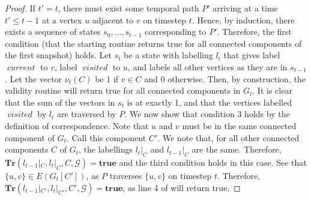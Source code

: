 \documentclass[a4paper,UKenglish,cleveref, autoref, thm-restate]{lipics-v2021} %
\DeclareMathOperator{\visited}{\textit{visited}}
\DeclareMathOperator{\current}{\textit{current}}
\begin{document}
\begin{toappendix}
\begin{proof}
    If $t' = t$, there must exist some temporal path $P'$ arriving at a time $t' \leq t-1$ at a vertex $u$ adjacent to $v$ on timestep $t$. Hence, by induction, there exists a sequence of states $s_0, ..., s_{t-1}$ corresponding to $P'$. Therefore, the first condition (that the starting routine returns true for all connected components of the first snapshot) holds. Let $s_t$ be a state with labelling $l_t$ that gives label $\current$ to $v$, label $\visited$ to $u$, and labels all other vertices as they are in $s_{t-1}$. Let the vector $\nu_t(C)$ be 1 if $v\in C$ and 0 otherwise. Then, by construction, the validity routine will return true for all connected components in $G_t$. It is clear that the sum of the vectors in $s_t$ is at exactly 1, and that the vertices labelled $\visited$ by $l_t$ are traversed by $P$. We now show that condition 3 holds by the definition of correspondence. Note that $u$ and $v$ must be in the same connected component of $G_t$. Call this component $C'$. We note that, for all other connected components $C$ of $G_t$, the labellings $l_t|_C$ and $l_{t-1}|_C$ are the same. Therefore, $\textbf{Tr}(l_{t-1}|_C, l_t|_C, C,\mathcal{G})=\textbf{true}$ and the third condition holds in this case. See that $\{u,v\} \in E(G_t[C'])$, as $P$ traverses $\{u,v\}$ on timestep $t$. Therefore, $\textbf{Tr}(l_{t-1}|_{C'}, l_t|_{C'}, C',\mathcal{G})=\textbf{true}$, as line 4 of  will return true.
    

\end{proof}
\end{toappendix}
\end{document}
